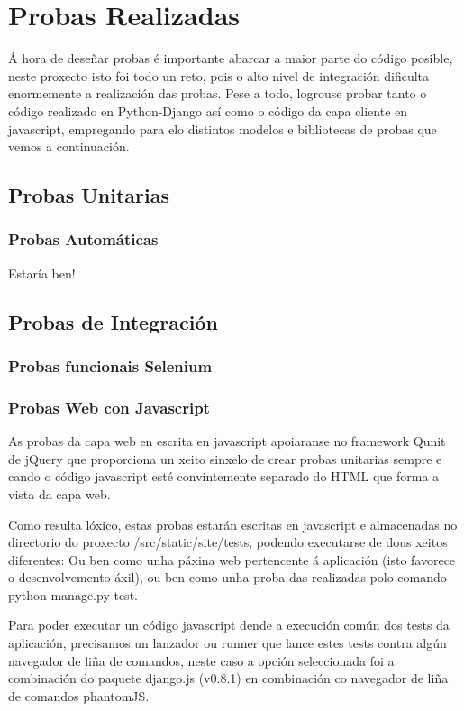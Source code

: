\chapter{Probas Realizadas}

Á hora de deseñar probas é importante abarcar a maior parte do código posible, neste proxecto isto
foi todo un reto, pois o alto nivel de integración dificulta enormemente a realización das probas.
Pese a todo, logrouse probar tanto o código realizado en Python-Django así como o código da capa 
cliente en javascript, empregando para elo distintos modelos e bibliotecas de probas que vemos a
continuación.

\section{Probas Unitarias}
  \subsection{Probas Automáticas}
  Estaría ben!

\section{Probas de Integración}
    \subsection{Probas funcionais Selenium}

    \subsection{Probas Web con Javascript}
        As probas da capa web en escrita en javascript apoiaranse no framework Qunit de 
        jQuery que proporciona un xeito sinxelo de crear probas unitarias sempre e cando o código 
        javascript esté convintemente separado do HTML que forma a vista da capa web.
        
        Como resulta lóxico, estas probas estarán escritas en javascript e almacenadas no directorio
        do proxecto /src/static/site/tests, podendo executarse de dous xeitos diferentes: Ou ben 
        como unha páxina web pertencente á aplicación (isto favorece o desenvolvemento áxil), ou ben
        como unha proba das realizadas polo comando python manage.py test.
        
        Para poder executar un código javascript dende a execución común dos tests da aplicación, 
        precisamos un lanzador ou runner que lance estes tests contra algún navegador de liña de 
        comandos, neste caso a opción seleccionada foi a combinación do paquete django.js (v0.8.1)
        en combinación co navegador de liña de comandos phantomJS. 
        
